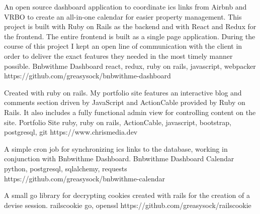\begin{cventries}
	\cventry
	{An open source dashboard application to coordinate ics links from Airbnb and VRBO to create an all-in-one calendar for easier property management. This project is built with Ruby on Rails as the backend and with React and Redux for the frontend. The entire frontend is built as a single page application. During the course of this project I kept an open line of communication with the client in order to deliver the exact features they needed in the most timely manner possible.}
	{Bnbwithme Dashboard}
	{react, redux, ruby on rails, javascript, webpacker}
	{https://github.com/greasysock/bnbwithme-dashboard}
	{}
	
	\vspace{-5mm}
	\cventry
	{Created with ruby on rails. My portfolio site features an interactive blog and comments section driven by JavaScript and ActionCable provided by Ruby on Rails. It also includes a fully functional admin view for controlling content on the site.}
	{Portfolio Site}
	{ruby, ruby on rails, ActionCable, javascript, bootstrap, postgresql, git}
	{https://www.chrismedia.dev}
	{}
	
	\vspace{-5mm}
	\cventry
	{A simple cron job for synchronizing ics links to the database, working in conjunction with Bnbwithme Dashboard.}
	{Bnbwithme Dashboard Calendar}
	{python, postgresql, sqlalchemy, requests}
	{https://github.com/greasysock/bnbwithme-calendar}
	{}
	
	\vspace{-5mm}
	\cventry
	{A small go library for decrypting cookies created with rails for the creation of a devise session.}
	{railscookie}
	{go, openssl}
	{https://github.com/greasysock/railscookie}
	{}

\end{cventries}